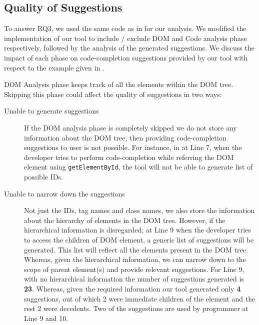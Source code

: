 	
	\subsection{Quality of Suggestions}
	\label{Sec:Suggestions}

	To answer RQ3, we used the same \javascript code as in  for our analysis. We modified the implementation of our tool to include / exclude DOM and Code analysis phase respectively, followed by the analysis of the generated suggestions. We discuss the impact of each phase on code-completion suggestions provided by our tool with respect to the example given in .
	
	 DOM Analysis phase keeps track of all the elements within the DOM tree. Skipping this phase could affect the quality of suggestions in two ways:
	\begin{description}
		\item[Unable to generate suggestions] If the DOM analysis phase is completely skipped \ie we do not store any information about the DOM tree, then providing code-completion suggestions to user is not possible. For instance, in  at Line 7, when the developer tries to perform code-completion while referring the DOM element using \texttt{getElementById}, the tool will not be able to generate list of possible IDs.
		
		\item[Unable to narrow down the suggestions] Not just the IDs, tag names and class names, we also store the information about the hierarchy of elements in the DOM tree. However, if the hierarchical information is disregarded; at Line 9 when the developer tries to access the children of DOM element, a generic list of suggestions will be generated. This list will reflect all the elements present in the DOM tree. Whereas, given the hierarchical information, we can narrow down to the scope of parent element(s) and provide relevant suggestions. For Line 9, with no hierarchical information the number of suggestions generated is \textbf{23}. Whereas, given the required information our tool generated only \textbf{4} suggestions, out of which 2 were immediate children of the element and the rest 2 were decedents. Two of the suggestions are used by programmer at Line 9 and 10. 
	\end{description}
			
